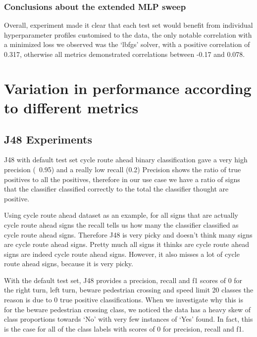 \documentclass[11pt]{article}
\begin{document}
\subsubsection{Conclusions about the extended MLP sweep}

Overall, experiment made it clear that each test set would benefit from individual hyperparameter profiles customised to the data, the only notable correlation with a minimized loss we observed was the ‘lbfgs’ solver, with a positive correlation of 0.317, otherwise all metrics demonstrated correlations between -0.17 and 0.078.


\newpage
\section{Variation in performance according to different metrics}
\subsection{J48 Experiments}

J48 with default test set cycle route ahead binary classification gave a very high precision (~0.95) and a really low recall (0.2) 
Precision shows the ratio of true positives to all the positives, therefore in our use case we have a ratio of signs that the classifier classified correctly to the total the classifier thought are positive. 
\par
Using cycle route ahead dataset as an example, for all signs that are actually cycle route ahead signs the recall tells us how many the classifier classified as cycle route ahead  signs. 
Therefore J48 is very picky and doesn't think many signs are cycle route ahead signs. Pretty much all signs it thinks are cycle route ahead signs are indeed cycle route ahead signs. However, it also misses a lot of cycle route ahead signs, because it is very picky.
\par
With the default test set, J48 provides a precision, recall and f1 scores of 0 for the right turn, left turn, beware pedestrian crossing and speed limit 20 classes the reason is due to 0 true positive classifications. When we investigate why this is for the beware pedestrian crossing class, we noticed the data has a heavy skew of class proportions towards ‘No’ with very few instances of ‘Yes’ found. In fact, this is the case for all of the class labels with scores of 0 for precision, recall and f1.
\end{document}

